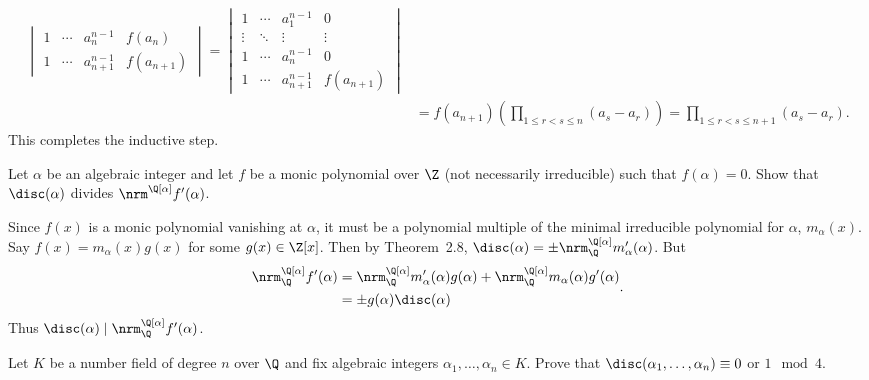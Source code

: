 \documentclass[11pt,letterpaper]{article}
\begin{document}
\begin{solution}
\[\begin{aligned}
\begin{vmatrix}
                1  &\cdots & a_n^{n-1} & f(a_n)\\
                1 & \cdots & a_{n+1}^{n-1} & f(a_{n+1}) 
            \end{vmatrix}=\begin{vmatrix}
                1  &\cdots & a_1^{n-1} & 0\\
               \vdots &  \ddots & \vdots & \vdots\\
                1 & \cdots & a_n^{n-1} & 0\\
                1 & \cdots & a_{n+1}^{n-1} & f(a_{n+1}) 
            \end{vmatrix}\\
            &=f(a_{n+1})\left(\prod_{1\leq r < s \leq n} (a_s-a_r)\right)=\prod_{1\leq r<s\leq n+1}(a_s-a_r).
        \end{aligned}
    \] 
    This completes the inductive step.

\end{solution}

\begin{cproblem}{2.21}
    Let $\alpha$ be an algebraic integer and let $f$ be a monic polynomial over $\Z$ (not necessarily irreducible) such that $f(\alpha)=0$. Show that $\disc(\alpha)$ divides $\nrm^{\Q[\alpha]}f'(\alpha)$.     
\end{cproblem}

\begin{solution}
    Since $f(x)$ is a monic polynomial vanishing at $\alpha$, it must be a polynomial multiple of the minimal irreducible polynomial for $\alpha$, $m_\alpha(x)$. Say $f(x)=m_\alpha(x)g(x)$ for some $g(x)\in \Z[x]$. Then by Theorem~2.8, $\disc(\alpha)=\pm\nrm^{\Q[\alpha]}_\Q m_\alpha'(\alpha)$. But
    \[
        \begin{aligned}
            \nrm^{\Q[\alpha]}_\Q f'(\alpha)&=\nrm^{\Q[\alpha]}_\Q m_\alpha'(\alpha)g(\alpha)+\nrm^{\Q[\alpha]}_\Q m_{\alpha}(\alpha)g'(\alpha)\\
            &=\pm g(\alpha) \disc(\alpha)
        \end{aligned}
    .\]
    Thus $\disc(\alpha) \mid \nrm^{\Q[\alpha]}_\Q f'(\alpha)$. 
\end{solution}

\begin{cproblem}{2.22}
    Let $K$ be a number field of degree $n$ over $\Q$ and fix algebraic integers $\alpha_1,\ldots,\alpha_n\in K$. Prove that $\disc(\alpha_1, \ldots, \alpha_n)\equiv 0$ or $1\mod 4$. 
\end{cproblem}
\end{document}
